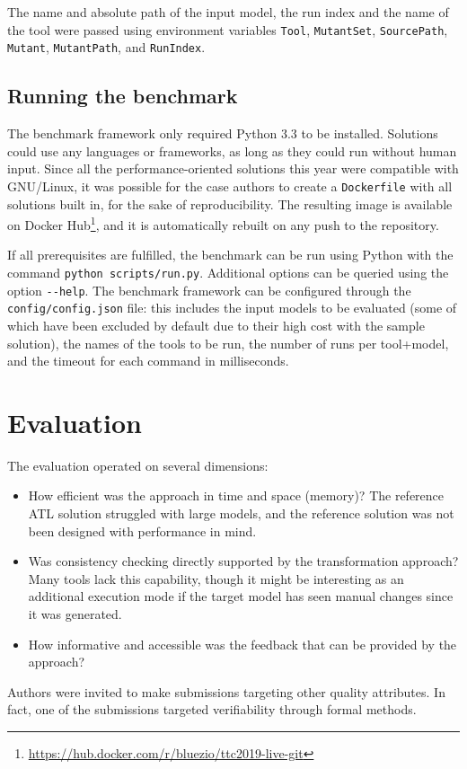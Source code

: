 \documentclass[a4paper]{article}
\newcommand*{\file}[1]{\texttt{#1}}
\begin{document}
The name and absolute path of the input model, the run index and the name of the
tool were passed using environment variables \file{Tool}, \file{MutantSet},
\file{SourcePath}, \file{Mutant}, \file{MutantPath}, and \file{RunIndex}.

\subsection{Running the benchmark}
\label{sec:running-benchmark}

The benchmark framework only required Python 3.3 to be installed. Solutions
could use any languages or frameworks, as long as they could run without human
input. Since all the performance-oriented solutions this year were compatible
with GNU/Linux, it was possible for the case authors to create a
\file{Dockerfile} with all solutions built in, for the sake of reproducibility.
The resulting image is available on Docker
Hub\footnote{\url{https://hub.docker.com/r/bluezio/ttc2019-live-git}}, and it is
automatically rebuilt on any push to the repository.

If all prerequisites are fulfilled, the benchmark can be run using Python with
the command \file{python scripts/run.py}. Additional options can be queried
using the option \file{{-}{-}help}. The benchmark framework can be configured
through the \file{config/config.json} file: this includes the input models to be
evaluated (some of which have been excluded by default due to their high cost
with the sample solution), the names of the tools to be run, the number of runs
per tool+model, and the timeout for each command in milliseconds.

\section{Evaluation}
\label{sec:evaluation}

The evaluation operated on several dimensions:

\begin{itemize}
\item How efficient was the approach in time and space (memory)? The reference
  ATL solution struggled with large models, and the reference solution was not
  been designed with performance in mind.

\item Was consistency checking directly supported by the transformation
  approach? Many tools lack this capability, though it might be interesting as
  an additional execution mode if the target model has seen manual changes since
  it was generated.

\item How informative and accessible was the feedback that can be provided by
  the approach?
\end{itemize}

Authors were invited to make submissions targeting other quality attributes. In
fact, one of the submissions targeted verifiability through formal methods.



\end{document}
